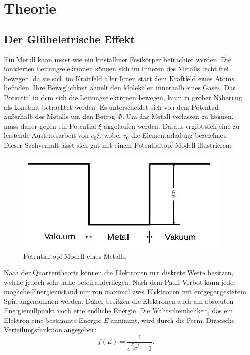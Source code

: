 \section{Theorie}
\label{sec:Theorie}

\subsection{Der Glüheletrische Effekt}
Ein Metall kann meist wie ein kristalliner Festkörper betrachtet werden.
Die ionisierten Leitungselektronen können sich im Inneren des Metalls recht frei
bewegen, da sie sich im Kraftfeld aller Ionen statt dem Kraftfeld eines Atoms
befinden. Ihre Beweglichkeit ähnelt den Molekülen innerhalb eines Gases.
Das Potential in dem sich die Leitungselektronen bewegen, kann in grober
Näherung als konstant betrachtet werden. Es unterscheidet sich von dem Potential
außerhalb des Metalls um den Betrag $\Phi$.
Um das Metall verlassen zu können, muss daher gegen ein Potential $\xi$ angelaufen
werden. Daraus ergibt sich eine zu leistende Austrittsarbeit von $e_0 \xi$,
wobei $e_0$ die Elementarladung bezeichnet.
Dieser Sachverhalt lässt sich gut mit einem Potentialtopf-Modell illustrieren:
\begin{figure}[H]
  \centering
  \includegraphics[scale=0.5]{content/potentialtopf.png}
  \caption{Potentialtopf-Modell eines Metalls.}
  \label{fig:potentialtopf}
\end{figure}
\noindent
Nach der Quantentheorie können die Elektronen nur diskrete Werte besitzen, welche
jedoch sehr nahe beieinanderliegen. Nach dem Pauli-Verbot kann jeder
mögliche Energiezustand nur von maximal zwei Elektronen mit entgegengestztem Spin
angenommen werden. Daher besitzen die Elektronen auch am absoluten Energienullpunkt
noch eine endliche Energie. Die Wahrscheinlichkeit, das ein Elektron eine bestimmte
Energie $E$ annimmt, wird durch die Fermi-Diracsche Verteilungsfunktion angegeben:
\begin{equation}
  f(E) = \frac{1}{e^{\frac{E - \xi}{k T}} + 1}.
  \label{eqn:fermidirac}
\end{equation}
